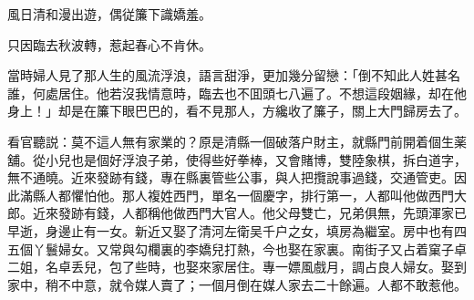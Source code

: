 \begin{myquote}
風日清和漫出遊，偶従簾下識嬌羞。

只因臨去秋波轉，惹起春心不肯休。
\end{myquote}

當時婦人見了那人生的風流浮浪，語言甜淨，更加幾分留戀：「倒不知此人姓甚名誰，何處居住。他若沒我情意時，臨去也不囬頭七八遍了。不想這段姻緣，却在他身上！」却是在簾下眼巴巴的，看不見那人，方纔收了簾子，關上大門歸房去了。

看官聽説：莫不這人無有家業的？原是清縣一個破落户財主，就縣門前開着個生薬舖。從小兒也是個好浮浪子弟，使得些好拳棒，又會賭博，雙陸象棋，拆白道字，無不通曉。近來發跡有錢，專在縣裏管些公事，與人把攬說事過錢，交通管吏。因此滿縣人都懼怕他。那人複姓西門，單名一個慶字，排行第一，人都叫他做西門大郎。近來發跡有錢，人都稱他做西門大官人。他父母雙亡，兄弟俱無，先頭渾家已早逝，身邊止有一女。新近又娶了清河左衛吴千户之女，填房為繼室。房中也有四五個丫鬟婦女。又常與勾欄裏的李嬌兒打熱，今也娶在家裏。南街子又占着窠子卓二姐，名卓丢兒，包了些時，也娶來家居住。專一嫖風戲月，調占良人婦女。娶到家中，稍不中意，就令媒人賣了；一個月倒在媒人家去二十餘遍。人都不敢惹他。

